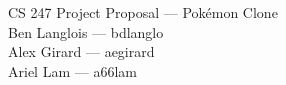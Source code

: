 \documentclass{article}
\begin{document}
\begin{center}
  {\LARGE CS 247 Project Proposal --- Pok\'emon Clone} \\
  \vspace{1em}
  {\large Ben Langlois --- bdlanglo} \\
  {\large Alex Girard --- aegirard} \\
  {\large Ariel Lam --- a66lam}
\end{center}
\end{document}
